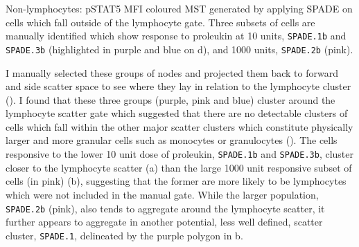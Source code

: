 {Non-lymphocytes: pSTAT5 MFI coloured \gls{MST} generated by applying \gls{SPADE} on cells which fall outside of the lymphocyte gate.}
{
  Three subsets of cells are manually identified which show response to proleukin at 10 units, \texttt{SPADE.1b} and \texttt{SPADE.3b} (highlighted in purple and blue on d), and 1000 units, \texttt{SPADE.2b} (pink).
}
% 

I manually selected these groups of nodes and projected them back to forward and side scatter space to see where they lay in relation
to the lymphocyte cluster ().  
I found that these three groups (purple, pink and blue) cluster around the lymphocyte scatter gate which suggested that there are no detectable clusters of cells which fall within the other major scatter clusters which constitute physically larger and more granular cells such as monocytes or granulocytes ().
The cells responsive to the lower 10 unit dose of proleukin, \texttt{SPADE.1b} and \texttt{SPADE.3b}, cluster closer to the lymphocyte scatter (a) than the large 1000 unit responsive subset of cells (in pink) (b), suggesting that the former are more likely to be lymphocytes which were not included in the manual gate.
While the larger population, \texttt{SPADE.2b} (pink), also tends to aggregate around the lymphocyte scatter, it further appears to aggregate in another potential, less well defined, scatter cluster, \texttt{SPADE.1}, delineated by the purple polygon in b.

